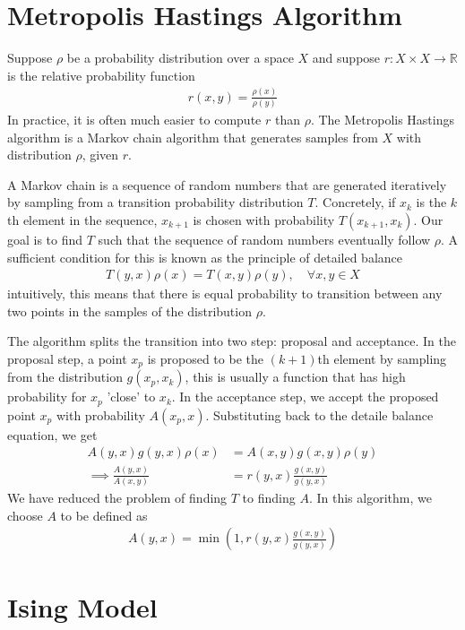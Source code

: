 \documentclass{article}
\begin{document}
\section{Metropolis Hastings Algorithm}

Suppose $\rho$ be a probability distribution over a space $X$
and suppose $r: X \times X \to \mathbb{R}$ is the relative probability function
\begin{align*}
    r(x, y) = \frac{\rho(x)}{\rho(y)}
\end{align*}
In practice, it is often much easier to compute $r$ than $\rho$.
The Metropolis Hastings algorithm is a Markov chain algorithm that generates samples from $X$ with distribution $\rho$, given $r$.

A Markov chain is a sequence of random numbers that are generated iteratively by sampling from a transition probability distribution $T$.
Concretely, if $x_k$ is the $k$th element in the sequence, $x_{k+1}$ is chosen with probability $T(x_{k + 1}, x_k)$. Our goal is to find $T$
such that the sequence of random numbers eventually follow $\rho$. A sufficient condition for this is known as the principle of detailed balance
\begin{align*}
    T(y, x) \rho(x) = T(x, y) \rho(y),\quad \forall x, y \in X
\end{align*}
intuitively, this means that there is equal probability to transition between any two points in the samples of the distribution $\rho$.

The algorithm splits the transition into two step: proposal and acceptance. In the proposal step, a point $x_p$ is proposed to be the $(k+1)$th element
by sampling from the distribution $g(x_p, x_k)$, this is usually a function that has high probability for $x_p$ 'close' to $x_k$. In the acceptance step,
we accept the proposed point $x_p$ with probability $A(x_p, x)$. Substituting back to the detaile balance equation, we get
\begin{align*}
    A(y, x) g(y, x) \rho(x) &= A(x, y) g(x, y) \rho(y) \\
    \implies \frac{A(y, x)}{A(x, y)} &= r(y, x) \frac{g(x, y)}{g(y, x)}
\end{align*}
We have reduced the problem of finding $T$ to finding $A$. In this algorithm, we choose $A$ to be defined as
\begin{align*}
    A(y, x) = \min\left(1, r(y, x) \frac{g(x, y)}{g(y, x)}\right)
\end{align*}

\section{Ising Model}
\end{document}
